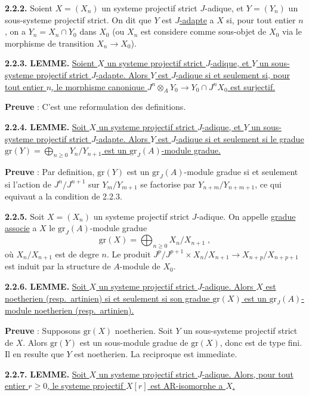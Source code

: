 \medskip
\noindent\textbf{2.2.2.} Soient $X = (X_n)$ un systeme projectif strict $J$-adique, et $Y = (Y_n)$ un sous-systeme projectif strict. On dit que $Y$ est \underline{$J$-adapte} a $X$ si, pour tout entier $n$, on a $Y_n = X_n \cap Y_0$ dans $X_0$ (ou $X_n$ est considere comme sous-objet de $X_0$ via le morphisme de transition $X_n \longrightarrow X_0$).

\medskip
\noindent\textbf{2.2.3.} \textbf{LEMME.} \underline{Soient $X$ un systeme projectif strict $J$-adique, et $Y$ un sous-systeme projectif strict $J$-adapte. Alors $Y$ est $J$-adique si et seulement si, pour tout entier $n$, le morphisme canonique $J^n \otimes_A Y_0 \longrightarrow Y_0 \cap J^n X_0$ est surjectif.}

\textbf{Preuve} : C'est une reformulation des definitions.

\medskip
\noindent\textbf{2.2.4.} \textbf{LEMME.} \underline{Soit $X$ un systeme projectif strict $J$-adique, et $Y$ un sous-systeme projectif strict $J$-adapte. Alors $Y$ est $J$-adique si et seulement si le gradue $
\mathrm{gr}(Y) = \bigoplus_{n \geq 0} Y_n/Y_{n+1}$
est un $\mathrm{gr}_J(A)$-module gradue.}

\textbf{Preuve} : Par definition, $\mathrm{gr}(Y)$ est un $\mathrm{gr}_J(A)$-module gradue si et seulement si l'action de $J^n/J^{n+1}$ sur $Y_m/Y_{m+1}$ se factorise par $Y_{n+m}/Y_{n+m+1}$, ce qui equivaut a la condition de 2.2.3.

\medskip
\noindent\textbf{2.2.5.} Soit $X = (X_n)$ un systeme projectif strict $J$-adique. On appelle \underline{gradue associe} a $X$ le $\mathrm{gr}_J(A)$-module gradue
\[
\mathrm{gr}(X) = \bigoplus_{n \geq 0} X_n / X_{n+1}\;,
\]
où $X_n / X_{n+1}$ est de degre $n$. Le produit $J^p/J^{p+1} \times X_n/X_{n+1} \longrightarrow X_{n+p}/X_{n+p+1}$ est induit par la structure de $A$-module de $X_0$.

\medskip
\noindent\textbf{2.2.6.} \textbf{LEMME.} \underline{Soit $X$ un systeme projectif strict $J$-adique. Alors $X$ est noetherien (resp.\ artinien) si et seulement si son gradue $\mathrm{gr}(X)$ est un $\mathrm{gr}_J(A)$-module noetherien (resp.\ artinien).}

\textbf{Preuve} : Supposons $\mathrm{gr}(X)$ noetherien. Soit $Y$ un sous-systeme projectif strict de $X$. Alors $\mathrm{gr}(Y)$ est un sous-module gradue de $\mathrm{gr}(X)$, donc est de type fini. Il en resulte que $Y$ est noetherien. La reciproque est immediate.

\medskip
\noindent\textbf{2.2.7.} \textbf{LEMME.} \underline{Soit $X$ un systeme projectif strict $J$-adique. Alors, pour tout entier $r \geq 0$, le systeme projectif $X[r]$ est AR-isomorphe a $X$.}

